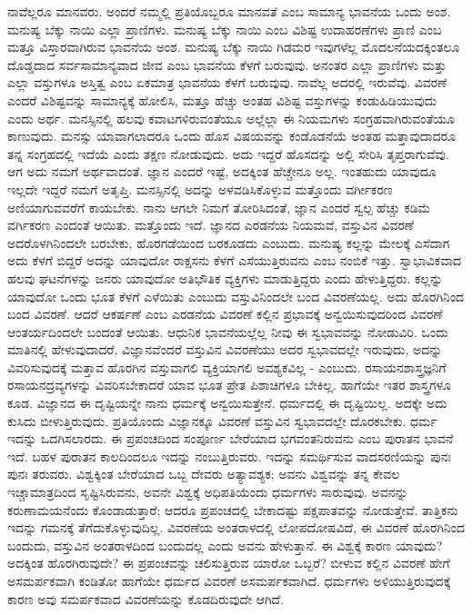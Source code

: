 ನಾವೆಲ್ಲರೂ ಮಾನವರು. ಅಂದರೆ ನಮ್ಮಲ್ಲಿ ಪ್ರತಿಯೊಬ್ಬರೂ ಮಾನವತೆ ಎಂಬ ಸಾಮಾನ್ಯ ಭಾವನೆಯ ಒಂದು ಅಂಶ. ಮನುಷ್ಯ ಬೆಕ್ಕು ನಾಯಿ ಎಲ್ಲಾ ಪ್ರಾಣಿಗಳು. ಮನುಷ್ಯ ಬೆಕ್ಕು ನಾಯಿ ಎಂಬ ವಿಶಿಷ್ಟ ಉದಾಹರಣೆಗಳು ಪ್ರಾಣಿ ಎಂಬ ಮತ್ತೂ ವಿಸ್ತಾರವಾಗಿರುವ ಭಾವನೆಯ ಅಂಶ. ಮನುಷ್ಯ ಬೆಕ್ಕು ನಾಯಿ ಗಿಡಮರ ಇವುಗಳೆಲ್ಲ ಮೊದಲನೆಯದಕ್ಕಿಂತಲೂ ದೊಡ್ಡದಾದ ಸರ್ವಸಾಮಾನ್ಯವಾದ ಜೀವ ಎಂಬ ಭಾವನೆಯ ಕೆಳಗೆ ಬರುವುವು. ಅನಂತರ ಎಲ್ಲಾ ಪ್ರಾಣಿಗಳು ಮತ್ತು ಎಲ್ಲಾ ವಸ್ತುಗಳೂ ಅಸ್ತಿತ್ವ ಎಂಬ ಏಕಮಾತ್ರ ಭಾವನೆಯ ಕೆಳಗೆ ಬರುವುವು. ನಾವೆಲ್ಲ ಅದರಲ್ಲಿ ಇರುವೆವು. ವಿವರಣೆ ಎಂದರೆ ವಿಶಿಷ್ಟವನ್ನು ಸಾಮಾನ್ಯಕ್ಕೆ ಹೋಲಿಸಿ, ಮತ್ತೂ ಹೆಚ್ಚು ಅಂತಹ ವಿಶಿಷ್ಟ ವಸ್ತುಗಳನ್ನು ಕಂಡುಹಿಡಿಯುವುದು ಎಂದು ಅರ್ಥ. ಮನಸ್ಸಿನಲ್ಲಿ ಹಲವು ಕವಾಟಗಳಿರುವಂತೆಯೂ ಅಲ್ಲೆಲ್ಲಾ ಈ ನಿಯಮಗಳು ಸಂಗ್ರಹವಾಗಿರುವಂತೆಯೂ ಕಾಣುವುದು. ಮನಸ್ಸು ಯಾವಾಗಲಾದರೂ ಒಂದು ಹೊಸ ವಿಷಯವನ್ನು ಕಂಡೊಡನೆಯೆ ಅಂತಹ ಮತ್ತಾವುದಾದರೂ ತನ್ನ ಸಂಗ್ರಹದಲ್ಲಿ ಇದೆಯೆ ಎಂದು ತಕ್ಷಣ ನೋಡುವುದು. ಅದು ಇದ್ದರೆ ಹೊಸದನ್ನು ಅಲ್ಲಿ ಸೇರಿಸಿ ತೃಪ್ತರಾಗುವೆವು. ಆಗ ಅದು ನಮಗೆ ಅರ್ಥವಾದಂತೆ. ಜ್ಞಾನ ಎಂದರೆ ಇಷ್ಟೆ, ಅದಕ್ಕಿಂತ ಹೆಚ್ಚೇನೂ ಅಲ್ಲ. ಇಂತಹುದು ಯಾವುದೂ ಇಲ್ಲದೇ ಇದ್ದರೆ ನಮಗೆ ಅತೃಪ್ತಿ. ಮನಸ್ಸಿನಲ್ಲಿ ಅದನ್ನು ಅಳವಡಿಸಿಕೊಳ್ಳುವ ಮತ್ತೊಂದು ವರ್ಗೀಕರಣ ಅಣಿಯಾಗುವವರೆಗೆ ಕಾಯಬೇಕು. ನಾನು ಆಗಲೇ ನಿಮಗೆ ತೋರಿಸಿದಂತೆ, ಜ್ಞಾನ ಎಂದರೆ ಸ್ವಲ್ಪ ಹೆಚ್ಚು ಕಡಿಮೆ ವರ್ಗಿಕರಣ ಎಂದಂತೆ ಆಯಿತು. ಮತ್ತೊಂದು ಇದೆ. ಜ್ಞಾನದ ಎರಡನೆಯ ನಿಯಮವೆ, ವಸ್ತುವಿನ ವಿವರಣೆ ಅದರೊಳಗಿನಿಂದಲೇ ಬರಬೇಕು, ಹೊರಗಡೆಯಿಂದ ಬರಕೂಡದು ಎಂಬುದು. ಮನುಷ್ಯ ಕಲ್ಲನ್ನು ಮೇಲಕ್ಕೆ ಎಸೆದಾಗ ಅದು ಕೆಳಗೆ ಬಿದ್ದರೆ ಅದನ್ನು ಯಾವುದೋ ರಾಕ್ಷಸನು ಕೆಳಗೆ ಎಸೆಯುತ್ತಿರುವನು ಎಂಬ ನಂಬಿಕೆ ಇತ್ತು. ಸ್ವಾಭಾವಿಕವಾದ ಹಲವು ಘಟನೆಗಳನ್ನು ಜನರು ಯಾವುದೋ ಅತಿಭೌತಿಕ ವ್ಯಕ್ತಿಗಳು ಮಾಡುತ್ತಿದ್ದರು ಎಂದು ಹೇಳುತ್ತಿದ್ದರು. ಕಲ್ಲನ್ನು ಯಾವುದೋ ಒಂದು ಭೂತ ಕೆಳಗೆ ಎಳೆಯಿತು ಎಂಬುದು ವಸ್ತುವಿನಿಂದಲೇ ಬಂದ ವಿವರಣೆಯಲ್ಲ. ಅದು ಹೊರಗಿನಿಂದ ಬಂದ ವಿವರಣೆ. ಆದರೆ ಆಕರ್ಷಣೆ ಎಂಬ ಎರಡನೆಯ ವಿವರಣೆ ಕಲ್ಲಿನ ಪ್ರಭಾವಕ್ಕೆ ಅನ್ವಯಿಸುವುದರಿಂದ ವಿವರಣೆ ಆಂತರ್ಯದಿಂದಲೇ ಬಂದಂತೆ ಆಯಿತು. ಆಧುನಿಕ ಭಾವನೆಯಲ್ಲೆಲ್ಲ ನೀವು ಈ ಸ್ವಭಾವವನ್ನು ನೋಡುವಿರಿ. ಒಂದು ಮಾತಿನಲ್ಲಿ ಹೇಳುವುದಾದರೆ, ವಿಜ್ಞಾನವೆಂದರೆ ವಸ್ತುವಿನ ವಿವರಣೆಯು ಅದರ ಸ್ವಭಾವದಲ್ಲೇ ಇರುವುದು, ಅದನ್ನು ವಿವರಿಸುವುದಕ್ಕೆ ಮತ್ತಾವ ಹೊರಗಿನ ವಸ್ತುವಾಗಲಿ ವ್ಯಕ್ತಿಯಾಗಲಿ ಅವಶ್ಯಕವಿಲ್ಲ - ಎಂಬುದು. ರಸಾಯನಶಾಸ್ತ್ರಜ್ಞನಿಗೆ ರಸಾಯನದ್ರವ್ಯಗಳನ್ನು ವಿವರಿಸಬೇಕಾದರೆ ಯಾವ ಭೂತ ಪ್ರೇತ ಪಿಶಾಚಿಗಳೂ ಬೇಕಿಲ್ಲ. ಹಾಗೆಯೇ ಇತರ ಶಾಸ್ತ್ರಗಳೂ ಕೂಡ. ವಿಜ್ಞಾನದ ಈ ದೃಷ್ಟಿಯನ್ನೇ ನಾನು ಧರ್ಮಕ್ಕೆ ಅನ್ವಯಿಸುತ್ತೇನೆ. ಧರ್ಮದಲ್ಲಿ ಈ ದೃಷ್ಟಿಯಿಲ್ಲ. ಅದಕ್ಕೇ ಅದು ಕುಸಿದು ಬೀಳುತ್ತಿರುವುದು. ಪ್ರತಿಯೊಂದು ವಿಜ್ಞಾನಕ್ಕೂ ವಿವರಣೆ ವಸ್ತುವಿನ ಸ್ವಭಾವದಲ್ಲೇ ದೊರಕಬೇಕು. ಧರ್ಮ ಇದನ್ನು ಒದಗಿಸಲಾರದು. ಈ ಪ್ರಪಂಚದಿಂದ ಸಂಪೂರ್ಣ ಬೇರೆಯಾದ ಭಗವಂತನಿರುವನು ಎಂಬ ಪುರಾತನ ಭಾವನೆ ಇದೆ. ಬಹಳ ಪುರಾತನ ಕಾಲದಿಂದಲೂ ಇದನ್ನು ನಂಬುತ್ತಿರುವರು. ಇದನ್ನು ಸಮರ್ಥಿಸುವ ವಾದಸರಣಿಯನ್ನು ಪುನಃ ಪುನಃ ತರುವರು. ವಿಶ್ವಕ್ಕಿಂತ ಬೇರೆಯಾದ ಒಬ್ಬ ದೇವರು ಅತ್ಯಾವಶ್ಯಕ; ಅವನು ವಿಶ್ವವನ್ನು ತನ್ನ ಕೇವಲ ಇಚ್ಚಾಮಾತ್ರದಿಂದ ಸೃಷ್ಟಿಸಿರುವನು, ಅವನೇ ವಿಶ್ವಕ್ಕೆ ಅಧಿಪತಿಯೆಂದು ಧರ್ಮಗಳು ಸಾರುವುವು. ಅವನನ್ನು ಕರುಣಾಮಯನೆಂದು ಕೊಂಡಾಡುತ್ತಾರೆ; ಆದರೂ ಪ್ರಪಂಚದಲ್ಲಿ ಬೇಕಾದಷ್ಟು ಪಕ್ಷಪಾತವನ್ನು ನೋಡುತ್ತೇವೆ. ತಾತ್ತಿಕನು ಇದನ್ನು ಗಮನಕ್ಕೆ ತೆಗೆದುಕೊಳ್ಳುವುದಿಲ್ಲ. ವಿವರಣೆಯ ಅಂತರಾಳದಲ್ಲಿ ಲೋಪದೋಷವಿದೆ, ಈ ವಿವರಣೆ ಹೊರಗಿನಿಂದ ಬಂದುದು, ವಸ್ತುವಿನ ಅಂತರಾಳದಿಂದ ಬಂದುದಲ್ಲ ಎಂದು ಅವನು ಹೇಳುತ್ತಾನೆ. ಈ ವಿಶ್ವಕ್ಕೆ ಕಾರಣ ಯಾವುದು? ಅದಕ್ಕಿಂತ ಹೊರಗಿರುವುದೇ? ಈ ಪ್ರಪಂಚವನ್ನು ಚಲಿಸುತ್ತಿರುವ ಯಾರೋ ಒಬ್ಬರೆ? ಬೀಳುವ ಕಲ್ಲಿನ ವಿವರಣೆ ಹೇಗೆ ಅಸಮರ್ಪಕವಾಗಿ ಕಂಡಿತೋ ಹಾಗೆಯೇ ಧರ್ಮದ ವಿವರಣೆ ಅಸಮರ್ಪಕವಾಗಿದೆ. ಧರ್ಮಗಳು ಅಳಿಯುತ್ತಿರುವುದಕ್ಕೆ ಕಾರಣ ಅವು ಸಮರ್ಪಕವಾದ ವಿವರಣೆಯನ್ನು ಕೊಡದಿರುವುದೇ ಆಗಿದೆ.

